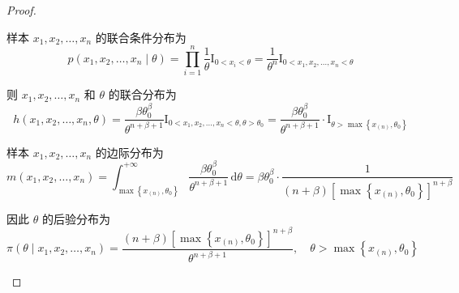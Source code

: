 \documentclass[normal,founder,mtpro2,cn]{elegantnote}
\begin{document}
\begin{enumerate}
\begin{proof}
\begin{enumerate}
                      样本 $x_{1},x_{2},\ldots,x_{n}$ 的联合条件分布为
                      \begin{equation*}
                          p\left(x_{1},x_{2},\ldots,x_{n}\mid\theta\right)=\prod_{i=1}^{n}\frac{1}{\theta}\mathrm{I}_{0<x_{i}<\theta}=\frac{1}{\theta^{n}}\mathrm{I}_{0<x_{1},x_{2},\ldots,x_{n}<\theta}
                      \end{equation*}

                      则 $x_{1},x_{2},\ldots,x_{n}$ 和 $\theta$ 的联合分布为
                      \begin{equation*}
                          h\left(x_{1},x_{2},\ldots,x_{n},\theta\right)=\frac{\beta\theta_{0}^{\beta}}{\theta^{n+\beta+1}}\mathrm{I}_{0<x_{1},x_{2},\ldots,x_{n}<\theta,\theta>\theta_{0}}=\frac{\beta\theta_{0}^{\beta}}{\theta^{n+\beta+1}}\cdot\mathrm{I}_{\theta>\max\left\{x_{(n)},\theta_{0}\right\}}
                      \end{equation*}

                      样本 $x_{1},x_{2},\ldots,x_{n}$ 的边际分布为
                      \begin{equation*}
                          m\left(x_{1},x_{2},\ldots,x_{n}\right)=\int_{\max\left\{x_{(n)},\theta_{0}\right\}}^{+\infty}\frac{\beta\theta_{0}^{\beta}}{\theta^{n+\beta+1}}\,\mathrm{d}\theta=\beta\theta_{0}^{\beta}\cdot\frac{1}{(n+\beta)\left[\max\left\{x_{(n)},\theta_{0}\right\}\right]^{n+\beta}}
                      \end{equation*}

                      因此 $\theta$ 的后验分布为
                      \begin{equation*}
                          \pi\left(\theta\mid x_{1},x_{2},\ldots,x_{n}\right)=\frac{(n+\beta)\left[\max\left\{x_{(n)},\theta_{0}\right\}\right]^{n+\beta}}{\theta^{n+\beta+1}},\quad\theta>\max\left\{x_{(n)},\theta_{0}\right\}
                      \end{equation*}


\end{enumerate}
\end{proof}
\end{enumerate}
\end{document}
